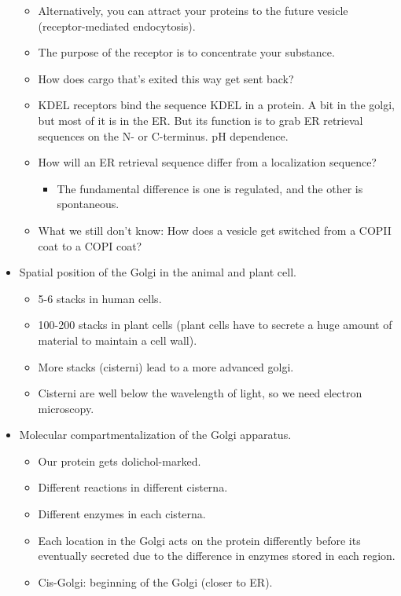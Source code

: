 \documentclass[../notes.tex]{subfiles}
\begin{document}
\begin{itemize}
\begin{itemize}
        \item Alternatively, you can attract your proteins to the future vesicle (receptor-mediated endocytosis).
        \item The purpose of the receptor is to concentrate your substance.
        \item How does cargo that's exited this way get sent back?
        \item KDEL receptors bind the sequence KDEL in a protein. A bit in the golgi, but most of it is in the ER. But its function is to grab ER retrieval sequences on the N- or C-terminus. pH dependence.
        \item How will an ER retrieval sequence differ from a localization sequence?
        \begin{itemize}
            \item The fundamental difference is one is regulated, and the other is spontaneous.
        \end{itemize}
        \item What we still don't know: How does a vesicle get switched from a COPII coat to a COPI coat?
    \end{itemize}
    \item Spatial position of the Golgi in the animal and plant cell.
    \begin{itemize}
        \item 5-6 stacks in human cells.
        \item 100-200 stacks in plant cells (plant cells have to secrete a huge amount of material to maintain a cell wall).
        \item More stacks (cisterni) lead to a more advanced golgi.
        \item Cisterni are well below the wavelength of light, so we need electron microscopy.
    \end{itemize}
    \item Molecular compartmentalization of the Golgi apparatus.
    \begin{itemize}
        \item Our protein gets dolichol-marked.
        \item Different reactions in different cisterna.
        \item Different enzymes in each cisterna.
        \item Each location in the Golgi acts on the protein differently before its eventually secreted due to the difference in enzymes stored in each region.
        \item Cis-Golgi: beginning of the Golgi (closer to ER).

\end{itemize}
\end{itemize}
\end{document}
